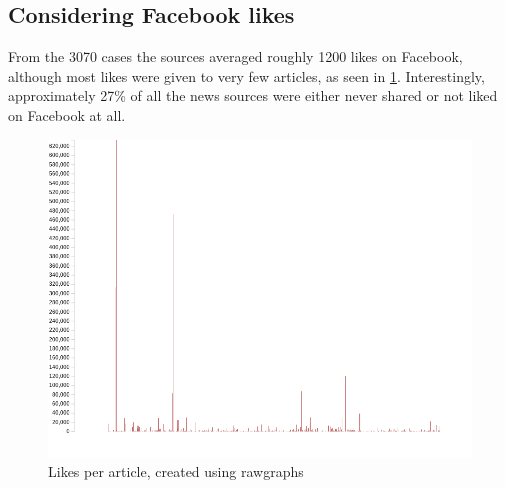 \documentclass{article}
\begin{document}
\subsection{Considering Facebook likes}
From the 3070 cases the sources averaged roughly 1200 likes on Facebook, although most likes were given to very few articles, as seen in \cref{fig:likes_per_article}. Interestingly, approximately 27\% of all the news sources were either never shared or not liked on Facebook at all.

\begin{figure}[H]
\caption{Likes per article, created using rawgraphs \cite{Mauri:2017:RVP:3125571.3125585}}
\label{fig:likes_per_article}
\centering
\includegraphics[width=.8\textwidth]{images/articles_vs_likes.png}
\end{figure}
\end{document}
